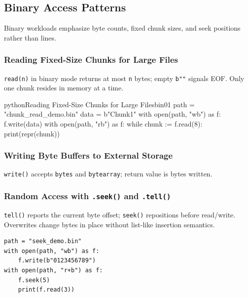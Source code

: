 \subsection{Binary Access Patterns}

Binary workloads emphasize byte counts, fixed chunk sizes, and seek positions rather than lines.

\subsubsection{Reading Fixed-Size Chunks for Large Files}

\texttt{read(n)} in binary mode returns at most \texttt{n} bytes; empty \texttt{b""} signals EOF. Only one chunk resides in memory at a time.

\begin{codebox}[]{python}{Reading Fixed-Size Chunks for Large Files}{bin01}
path = "chunk_read_demo.bin"
data = b"Chunk1\n"
with open(path, "wb") as f:
    f.write(data)
with open(path, "rb") as f:
    while chunk := f.read(8):
        print(repr(chunk))
\end{codebox}


\subsubsection{Writing Byte Buffers to External Storage}

\texttt{write()} accepts \texttt{bytes} and \texttt{bytearray}; return value is bytes written.

\subsubsection{Random Access with \texttt{.seek()} and \texttt{.tell()}}

\texttt{tell()} reports the current byte offset; \texttt{seek()} repositions before read/write. Overwrites change bytes in place without list-like insertion semantics.

\begin{verbatim}
path = "seek_demo.bin"
with open(path, "wb") as f:
    f.write(b"0123456789")
with open(path, "r+b") as f:
    f.seek(5)
    print(f.read(3))
\end{verbatim}
